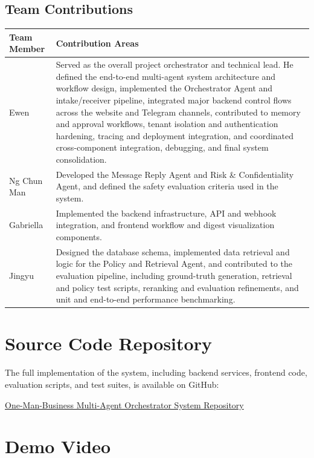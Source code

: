 \documentclass[11pt]{article}
\begin{document}
\subsection{Team Contributions}
\label{app:contributions}

\renewcommand{\arraystretch}{1.3}
\begin{longtable}{|p{2.8cm}|p{10.8cm}|}
\hline
\textbf{Team Member} & \textbf{Contribution Areas} \\
\hline
Ewen & Served as the overall project orchestrator and technical lead. He defined the end-to-end multi-agent system architecture and workflow design, implemented the Orchestrator Agent and intake/receiver pipeline, integrated major backend control flows across the website and Telegram channels, contributed to memory and approval workflows, tenant isolation and authentication hardening, tracing and deployment integration, and coordinated cross-component integration, debugging, and final system consolidation. \\
\hline
Ng Chun Man & Developed the Message Reply Agent and Risk \& Confidentiality Agent, and defined the safety evaluation criteria used in the system. \\
\hline
Gabriella & Implemented the backend infrastructure, API and webhook integration, and frontend workflow and digest visualization components. \\
\hline
Jingyu & Designed the database schema, implemented data retrieval and logic for the Policy and Retrieval Agent, and contributed to the evaluation pipeline, including ground-truth generation, retrieval and policy test scripts, reranking and evaluation refinements, and unit and end-to-end performance benchmarking. \\
\hline
\end{longtable}

\section{Source Code Repository}
\label{app:repo}

The full implementation of the system, including backend services, frontend code, evaluation scripts, and test suites, is available on GitHub:

\href{https://github.com/EwenCheung/One-Man-Business-Multi-Agent-Orchestrator-System}
{One-Man-Business Multi-Agent Orchestrator System Repository}

\section{Demo Video}
\label{app:demo}
\end{document}
